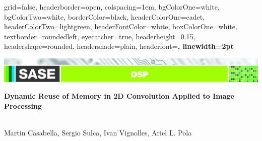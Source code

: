 \documentclass[a1paper,portrait,fontscale=0.43]{baposter}
\begin{document}
\begin{poster}
{
grid=false,
headerborder=open, %
colspacing=1em, %
bgColorOne=white, %
bgColorTwo=white, %
borderColor=black, %
headerColorOne=cadet, %
headerColorTwo=lightgreen, %
headerFontColor=white, %
boxColorOne=white, %
textborder=roundedleft, %
eyecatcher=true, %
headerheight=0.15\textheight, %
headershape=rounded, %
headershade=plain,
headerfont=\Large\bf\textsf, %
linewidth=2pt %
}
{}
%
%
{  
  {\includegraphics[trim=1.7cm 0 0 5cm, width=247mm]{DSP-02}\vspace{0.2em}}%


  \huge\bf\textsf %
  {Dynamic Reuse of Memory in 2D Convolution Applied to Image Processing}}
{\sf\vspace{0.5em}\\
    Martin Casabella,
    Sergio Sulca,
    Ivan Vignolles,
    Ariel L. Pola
    \small{

}}
\end{poster}
\end{document}

